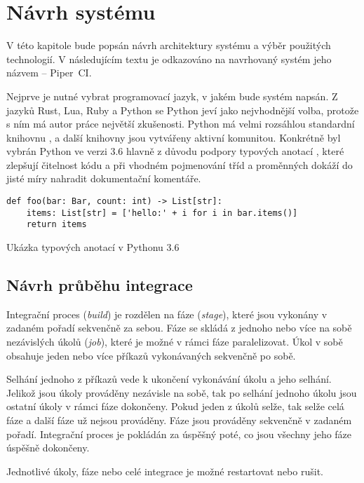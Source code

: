 \chapter{Návrh systému}

V této kapitole bude popsán návrh architektury systému a výběr použitých technologií.
V následujícím textu je odkazováno na navrhovaný systém jeho názvem -- Piper~CI.

Nejprve je nutné vybrat programovací jazyk, v jakém bude systém napsán.
Z jazyků Rust, Lua, Ruby a Python se Python jeví jako nejvhodnější volba, protože s ním má autor práce největší zkušenosti.
Python má velmi rozsáhlou standardní knihovnu \cite{python_stdlib}, a další knihovny jsou vytvářeny aktivní komunitou.
Konkrétně byl vybrán Python ve verzi 3.6 hlavně z důvodu podpory typových anotací \cite{python_pep484}, které zlepšují čitelnost kódu a při vhodném pojmenování tříd a proměnných dokáží do jisté míry nahradit dokumentační komentáře.

\begin{listing}[ht]
\begin{verbatim}
def foo(bar: Bar, count: int) -> List[str]:
    items: List[str] = ['hello:' + i for i in bar.items()]
    return items
\end{verbatim}
\caption{Ukázka typových anotací v Pythonu 3.6}
\end{listing}

\section{Návrh průběhu integrace}

Integrační proces (\textit{build}) je rozdělen na fáze (\textit{stage}), které jsou vykonány v zadaném pořadí sekvenčně za sebou.
Fáze se skládá z jednoho nebo více na sobě nezávislých úkolů (\textit{job}), které je možné v rámci fáze paralelizovat. 
Úkol v sobě obsahuje jeden nebo více příkazů vykonávaných sekvenčně po sobě.

Selhání jednoho z příkazů vede k ukončení vykonávání úkolu a jeho selhání.
Jelikož jsou úkoly prováděny nezávisle na sobě, tak po selhání jednoho úkolu jsou ostatní úkoly v rámci fáze dokončeny.
Pokud jeden z úkolů selže, tak selže celá fáze a další fáze už nejsou prováděny.
Fáze jsou prováděny sekvenčně v zadaném pořadí.
Integrační proces je pokládán za úspěšný poté, co jsou všechny jeho fáze úspěšně dokončeny.

Jednotlivé úkoly, fáze nebo celé integrace je možné restartovat nebo rušit.

